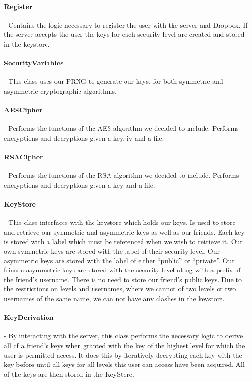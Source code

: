 \documentclass[12pt, titlepage]{article}
\begin{document}
\paragraph*{Register} - Contains the logic necessary to register the user with the server and Dropbox. If the server accepts the user the keys for each security level are created and stored in the keystore.

\paragraph*{SecurityVariables} - This class uses our PRNG to generate our keys, for both symmetric and asymmetric cryptographic algorithms.

\paragraph*{AESCipher} - Performs the functions of the AES algorithm we decided to include. Performs encryptions and decryptions given a key, iv and a file.

\paragraph*{RSACipher} - Performs the functions of the RSA algorithm we decided to include. Performs encryptions and decryptions given a key and a file.

\paragraph*{KeyStore} - This class interfaces with the keystore which holds our keys. Is used to store and retrieve our symmetric and asymmetric keys as well as our friends. Each key is stored with a label which must be referenced when we wish to retrieve it. Our own symmetric keys are stored with the label of their security level. Our asymmetric keys are stored with the label of either ``public'' or ``private''. Our friends asymmetric keys are stored with the security level along with a prefix of the friend's username. There is no need to store our friend's public keys. Due to the restrictions on levels and usernames, where we cannot of two levels or two usernames of the same name, we can not have any clashes in the keystore.

\paragraph*{KeyDerivation} - By interacting with the server, this class performs the necessary logic to derive all of a friend's keys when granted with the key of the highest level for which the user is permitted access. It does this by iteratively decrypting each key with the key before until all keys for all levels this user can access have been acquired. All of the keys are then stored in the KeyStore.
\end{document}
